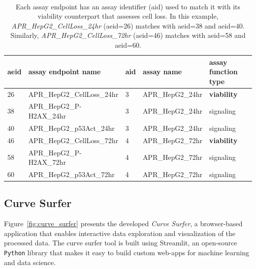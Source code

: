 \begin{table}[h]
    \centering
    \small
    \caption{Each assay endpoint has an assay identifier (aid) used to match it with its viability counterpart that assesses cell loss. In this example, \emph{APR\_HepG2\_CellLoss\_24hr} (aeid=26) matches with aeid=38 and aeid=40. Similarly, \emph{APR\_HepG2\_CellLoss\_72hr} (aeid=46) matches with aeid=58 and aeid=60.}
    ~\label{fig:aeid_acid_aid}
    \begin{tabular}{lllll}
    \toprule
    aeid & assay endpoint name & aid & assay name & assay function type \\
    \midrule
    26 & APR\_HepG2\_CellLoss\_24hr & 3 & APR\_HepG2\_24hr & \textbf{viability} \\
    38 & APR\_HepG2\_P-H2AX\_24hr & 3 & APR\_HepG2\_24hr & signaling \\
    40 & APR\_HepG2\_p53Act\_24hr & 3 & APR\_HepG2\_24hr & signaling \\
    46 & APR\_HepG2\_CellLoss\_72hr & 4 & APR\_HepG2\_72hr & \textbf{viability} \\
    58 & APR\_HepG2\_P-H2AX\_72hr & 4 & APR\_HepG2\_72hr & signaling \\
    60 & APR\_HepG2\_p53Act\_72hr & 4 & APR\_HepG2\_72hr & signaling \\
    \bottomrule
    \end{tabular}
\end{table}


\subsection{Curve Surfer}
Figure~\ref{fig:curve_surfer} presents the developed \emph{Curve Surfer}, a browser-based application that enables interactive data exploration and visualization of the processed data. The curve surfer tool is built using Streamlit, an open-source \texttt{Python} library that makes it easy to build custom web-apps for machine learning and data science. 



